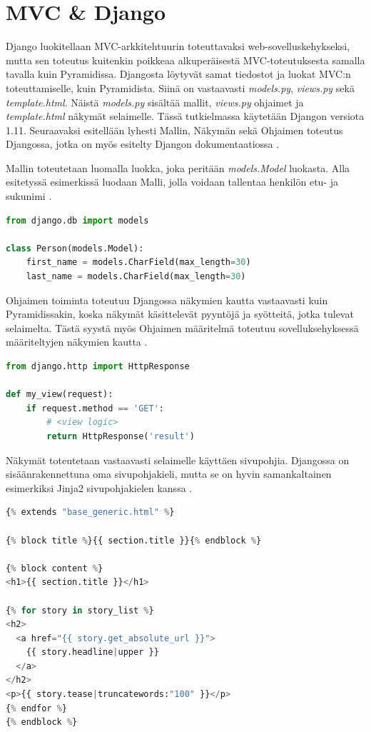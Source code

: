 \documentclass[utf8]{gradu3}
\begin{document}
\section{MVC \& Django}
Django luokitellaan MVC-arkkitehtuurin toteuttavaksi web-sovelluskehykseksi, mutta sen toteutus kuitenkin poikkeaa alkuperäisestä MVC-toteutuksesta samalla tavalla kuin Pyramidissa. Djangosta löytyvät samat tiedostot  ja luokat MVC:n toteuttamiselle, kuin Pyramidista. Siinä on vastaavasti \emph{models.py}, \emph{views.py} sekä \emph{template.html}. Näistä \emph{models.py} sisältää mallit, \emph{views.py} ohjaimet ja \emph{template.html} näkymät selaimelle. Tässä tutkielmassa  käytetään Djangon versiota 1.11. Seuraavaksi esitellään lyhesti Mallin, Näkymän sekä Ohjaimen toteutus Djangossa, jotka on myös esitelty Djangon dokumentaatiossa \parencite{django_docs}.

Mallin toteutetaan luomalla luokka, joka peritään \emph{models.Model} luokasta. Alla esitetyssä esimerkissä luodaan Malli, jolla voidaan tallentaa henkilön etu- ja sukunimi \parencite{django_model}.

\begin{lstlisting}[language=Python]
from django.db import models

class Person(models.Model):
    first_name = models.CharField(max_length=30)
    last_name = models.CharField(max_length=30)
\end{lstlisting}

Ohjaimen toiminta toteutuu Djangossa näkymien kautta vastaavasti kuin Pyramidissakin, koska näkymät käsittelevät pyyntöjä ja syötteitä, jotka tulevat selaimelta. Tästä syystä myös Ohjaimen määritelmä toteutuu  sovelluksehyksessä määriteltyjen näkymien kautta \parencite{django_view}.

\begin{lstlisting}[language=Python]
from django.http import HttpResponse

def my_view(request):
    if request.method == 'GET':
        # <view logic>
        return HttpResponse('result')
\end{lstlisting}

Näkymät toteutetaan vastaavasti selaimelle käyttäen sivupohjia. Djangossa on sisäänrakennettuna oma sivupohjakieli, mutta se on hyvin samankaltainen esimerkiksi Jinja2 sivupohjakielen kanssa \parencite{django_template}.

\begin{lstlisting}[language=Python]
{% extends "base_generic.html" %}

{% block title %}{{ section.title }}{% endblock %}

{% block content %}
<h1>{{ section.title }}</h1>

{% for story in story_list %}
<h2>
  <a href="{{ story.get_absolute_url }}">
    {{ story.headline|upper }}
  </a>
</h2>
<p>{{ story.tease|truncatewords:"100" }}</p>
{% endfor %}
{% endblock %}
\end{lstlisting}
\end{document}
